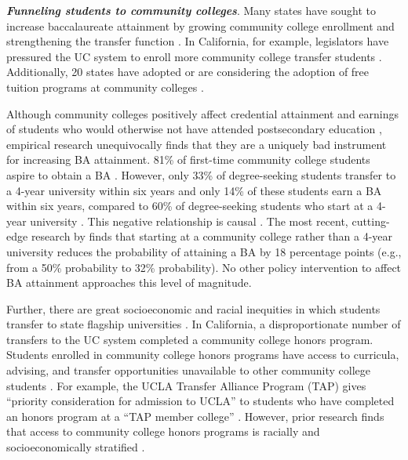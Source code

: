 \documentclass[twoside]{article}
\begin{document}

\textbf{\textit{Funneling students to community colleges}}. Many states have sought to increase baccalaureate attainment by growing community college enrollment and strengthening the transfer function \citep{RN4430,RN4431}. In California, for example, legislators have pressured the UC system to enroll more community college transfer students \citep{RN4427}. Additionally, 20 states have adopted or are considering the adoption of free tuition programs at community colleges \citep{RN4425,RN4426}.




Although community colleges positively affect credential attainment and earnings of students who would otherwise not have attended postsecondary education \citep[e.g., ][]{RN4404}, empirical research unequivocally finds that they are a uniquely bad instrument for increasing BA attainment. 81\% of first-time community college students aspire to obtain a BA \citep{RN4406}. However, only 33\% of degree-seeking students transfer to a 4-year university within six years \citep{RN4406} and only 14\% of these students earn a BA within six years, compared to 60\% of degree-seeking students who start at a 4-year university \citep{RN4406}.  This negative relationship is causal \citep{RN4284,RN2261,RN4292,RN4405}. The most recent, cutting-edge research by \cite{RN4404} finds that starting at a community college rather than a 4-year university reduces the probability of attaining a BA by 18 percentage points (e.g., from a 50\% probability to 32\% probability).  No other policy intervention to affect BA attainment approaches this level of magnitude.

Further, there are great socioeconomic and racial inequities in which students transfer to state flagship universities \citep{RN1492,RN4406}. In California, a disproportionate number of transfers to the UC system completed a community college honors program. Students enrolled in community college honors programs have access to curricula, advising, and transfer opportunities unavailable to other community college students \citep{RN4444,RN4443}. For example, the UCLA Transfer Alliance Program (TAP) gives ``priority consideration for admission to UCLA'' to students who have completed an honors program at a ``TAP member college'' \citep{RN4432}. However, prior research finds that access to community college honors programs is racially and socioeconomically stratified \citep{RN4440,RN4441,RN4445}.
\end{document}

